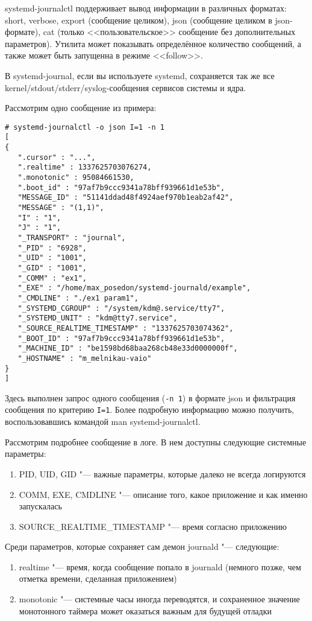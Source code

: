 \documentclass[10pt, a5paper]{article}
\begin{document}
systemd-journalctl поддерживает вывод информации в различных форматах: short, verbose, export (сообщение целиком), json (сообщение целиком в json-формате), cat (только <<пользовательское>> сообщение без дополнительных параметров). Утилита может показывать определённое количество сообщений, а также может быть запущенна в режиме <<follow>>.

В systemd-journal, если вы используете systemd, сохраняется так же все kernel/stdout/stderr/syslog-сообщения сервисов системы и ядра.

Рассмотрим одно сообщение из примера:

\begin{verbatim}
# systemd-journalctl -o json I=1 -n 1
[
{
   ".cursor" : "...",
   ".realtime" : 1337625703076274,
   ".monotonic" : 95084661530,
   ".boot_id" : "97af7b9ccc9341a78bff939661d1e53b",
   "MESSAGE_ID" : "51141ddad48f4924aef970b1eab2af42",
   "MESSAGE" : "(1,1)",
   "I" : "1",
   "J" : "1",
   "_TRANSPORT" : "journal",
   "_PID" : "6928",
   "_UID" : "1001",
   "_GID" : "1001",
   "_COMM" : "ex1",
   "_EXE" : "/home/max_posedon/systemd-journald/example",
   "_CMDLINE" : "./ex1 param1",
   "_SYSTEMD_CGROUP" : "/system/kdm@.service/tty7",
   "_SYSTEMD_UNIT" : "kdm@tty7.service",
   "_SOURCE_REALTIME_TIMESTAMP" : "1337625703074362",
   "_BOOT_ID" : "97af7b9ccc9341a78bff939661d1e53b",
   "_MACHINE_ID" : "be1598bd68baa268cb48e33d0000000f",
   "_HOSTNAME" : "m_melnikau-vaio"
}
]
\end{verbatim}

Здесь выполнен запрос одного сообщения (\verb!-n 1!) в формате json и фильтрация сообщения по критерию \verb!I=1!. Более подробную информацию можно получить, воспользовавшись командой man systemd-journalctl.

Рассмотрим подробнее сообщение в логе. В нем доступны следующие системные параметры:

\begin{enumerate}
  \item PID, UID, GID "--- важные параметры, которые далеко не всегда логируются
  \item COMM, EXE, CMDLINE "--- описание того, какое приложение и как именно запускалась
  \item SOURCE\_REALTIME\_TIMESTAMP "--- время согласно приложению
\end{enumerate}

Среди параметров, которые сохраняет сам демон journald "--- следующие:

\begin{enumerate}
  \item realtime "--- время, когда сообщение попало в journald (немного позже, чем отметка времени, сделанная приложением)
  \item monotonic "--- системные часы иногда переводятся, и сохраненное значение монотонного таймера может оказаться важным для будущей отладки
\end{enumerate}
\end{document}
